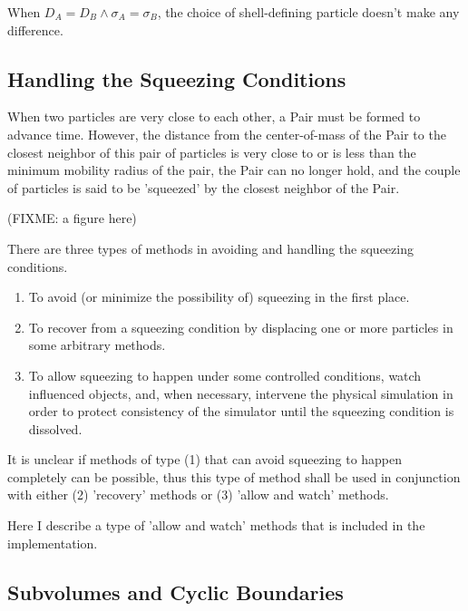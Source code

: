 \documentclass[english]{article}
\begin{document}
When $D_A = D_B \wedge \sigma_A = \sigma_B$, the choice of shell-defining particle
doesn't make any difference.








\subsection{Handling the Squeezing Conditions}

When two particles are very close to each other, a Pair must be formed
to advance time.  However, the distance from the center-of-mass of the
Pair to the closest neighbor of this pair of particles is very close
to or is less than the minimum mobility radius of the pair, the Pair
can no longer hold, and the couple of particles is said to be 'squeezed'
by the closest neighbor of the Pair.

(FIXME: a figure here)

There are three types of methods in avoiding and handling the squeezing
conditions.

\begin{enumerate}
\item To avoid (or minimize the possibility of) squeezing in the first place.

\item To recover from a squeezing condition by displacing one or more
  particles in some arbitrary methods.

\item To allow squeezing to happen under some controlled conditions,
  watch influenced objects, and, when necessary, intervene the
  physical simulation in order to protect consistency of the simulator
  until the squeezing condition is dissolved.
\end{enumerate}

It is unclear if methods of type (1) that can avoid squeezing to
happen completely can be possible, thus this type of method shall be used in
conjunction with either (2) 'recovery' methods or (3) 'allow and
watch' methods.

Here I describe a type of 'allow and watch' methods that is included
in the implementation.



\subsection{Subvolumes and Cyclic Boundaries}
\end{document}
